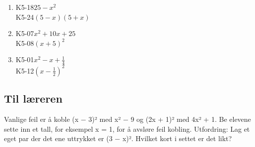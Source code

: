 \documentclass[11pt,a4paper]{article}
\begin{document}
\begin{enumerate}[leftmargin=1.6em, itemsep=0.7em]
\item \begin{minipage}[t]{\linewidth}\textsf{\small K5-18}\quad $25 - x^2$ \\ \textsf{\small K5-24}\quad $(5 - x)(5 + x)$\end{minipage}
\item \begin{minipage}[t]{\linewidth}\textsf{\small K5-07}\quad $x^2 + 10x + 25$ \\ \textsf{\small K5-08}\quad $(x + 5)^2$\end{minipage}
\item \begin{minipage}[t]{\linewidth}\textsf{\small K5-01}\quad $x^2 - x + \frac{1}{4}$ \\ \textsf{\small K5-12}\quad $\left(x - \frac{1}{2}\right)^2$\end{minipage}
\end{enumerate}
\subsection*{Til læreren}
Vanlige feil er å koble (x − 3)² med x² − 9 og (2x + 1)² med 4x² + 1. Be elevene sette inn et tall, for eksempel x = 1, for å avsløre feil kobling. Utfordring: Lag et eget par der det ene uttrykket er (3 − x)². Hvilket kort i settet er det likt?
\end{document}
